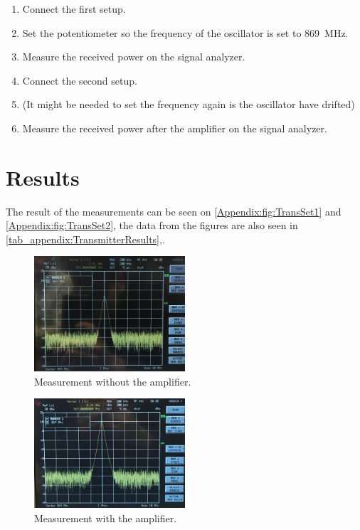 \begin{enumerate}
\item Connect the first setup.
\item Set the potentiometer so the frequency of the oscillator is set to \SI{869}{\mega\hertz}.
\item Measure the received power on the signal analyzer.
\item Connect the second setup.
\item (It might be needed to set the frequency again is the oscillator have drifted)
\item Measure the received power after the amplifier on the signal analyzer.
\end{enumerate}

\section*{Results}
The result of the measurements can be seen on \autoref{Appendix:fig:TransSet1} and \autoref{Appendix:fig:TransSet2}, the data from the figures are also seen in \autoref{tab_appendix:TransmitterResults},.
\begin{figure} [!h]
    \centering
        \includegraphics[width=0.5\textwidth]{figures/test/transet1}
        \caption{Measurement without the amplifier.}
        \label{Appendix:fig:TransSet1}
\end{figure}
\begin{figure} [!h]
    \centering
        \includegraphics[width=0.5\textwidth]{figures/test/transet2}
        \caption{Measurement with the amplifier.}
        \label{Appendix:fig:TransSet2}
\end{figure}

